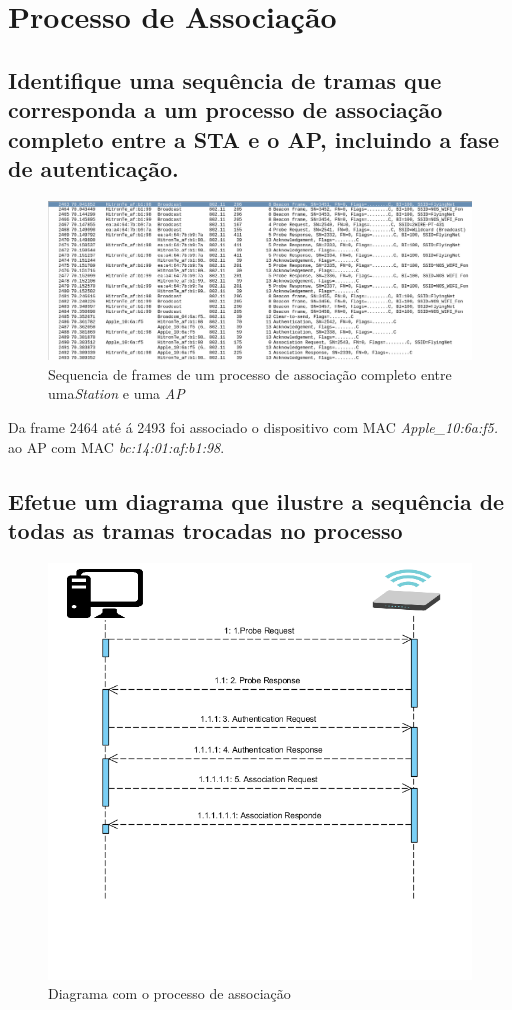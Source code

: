 \documentclass[a4paper]{article}
\begin{document}
\section{Processo de Associação}
\setcounter{subsection}{11}

\subsection{Identifique uma sequência de tramas que corresponda a um processo de
associação completo entre a STA e o AP, incluindo a fase de autenticação.}
\begin{figure}[H]
\centering
\includegraphics[scale=0.30]{pics/p12.png}
\caption{Sequencia de frames de um processo de associação completo entre uma\textit{Station} e uma \textit{AP}}
\end{figure}
Da frame 2464 até á 2493 foi associado o dispositivo com MAC \textit{Apple\_10:6a:f5.} ao AP com MAC  \textit{bc:14:01:af:b1:98}.


\subsection{Efetue um diagrama que ilustre a sequência de todas as tramas trocadas no
processo}
\begin{figure}[H]
\centering
\includegraphics[scale=0.50]{pics/diagrama.png}
\caption{Diagrama com o processo de associação}
\end{figure}
\end{document}
